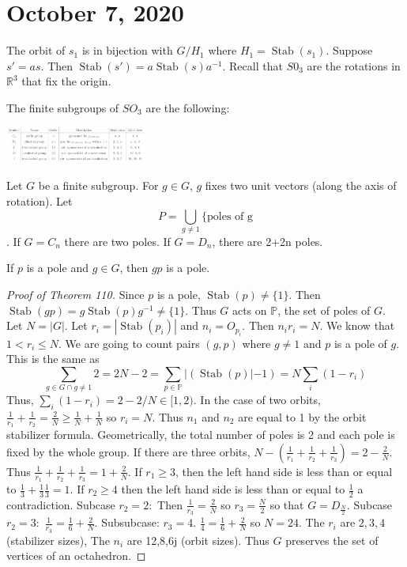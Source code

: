 \documentclass{article}
\newcommand{\R}{\mathbb{R}}
\DeclareMathOperator{\Stab}{Stab}
\begin{document}
\section{October 7, 2020}
The orbit of $s_1$ is in bijection with $G/H_1$ where $H_1=\Stab(s_1)$. Suppose $s'=as$. Then $\Stab(s')=a\Stab(s)a^{-1}$. Recall that $S0_3$ are the rotations in $\R^3$ that fix the origin.
\begin{theorem}
The finite subgroups of $SO_3$ are the following:
    \begin{center}
        \includegraphics[width=0.35\textwidth]{Image 1 1072020.PNG}
    \end{center}
\end{theorem}
Let $G$ be a finite subgroup. For $g\in G$, $g$ fixes two unit vectors (along the axis of rotation). Let $$P=\bigcup_{g\neq 1}\{\textrm{poles of g}$$. If $G=C_n$ there are two poles. If $G=D_n$, there are 2+2n poles.
\begin{lemma}
If $p$ is a pole and $g\in G$, then $gp$ is a  pole.
\end{lemma}
\begin{proof}[Proof of Theorem 110]
Since $p$ is a pole, $\Stab(p)\neq \{1\}$. Then $\Stab(gp)=g\Stab(p)g^{-1}\neq\{1\}$. Thus $G$ acts on $\mathbb{P}$, the set of poles of $G$. Let $N=|G|$. Let $r_i=|\Stab(p_i)|$ and $n_i=O_{p_i}$. Then $n_ir_i=N$. We know that $1<r_i\leq N$. We are going to count pairs $(g,p)$ where $g\neq 1$ and $p$ is a pole of $g$. This is the same as $$\sum_{g\in G\cap g\neq 1}2=2N-2=\sum_{p\in\mathbb{P}}|(\Stab(p)|-1)=N\sum_i(1-r_i)$$ Thus, $\sum_i(1-r_i)=2-2/N\in[1,2)$. In the case of two orbits, $\frac{1}{r_1}+\frac{1}{r_2}=\frac{2}{N}\geq \frac{1}{N}+\frac{1}{N}$ so $r_i=N$. Thus $n_1$ and $n_2$ are equal to 1 by the orbit stabilizer formula. Geometrically, the total number of poles is 2 and each pole is fixed by the whole group. If there are three orbits, $N-(\frac{1}{r_1}+\frac{1}{r_2}+\frac{1}{r_3})=2-\frac{2}{N}$. Thus $\frac{1}{r_1}+\frac{1}{r_2}+\frac{1}{r_3}=1+\frac{2}{N}$. If $r_1\geq 3$, then the left hand side is less than or equal to $\frac{1}{3}+\frac{1}{3}\frac{1}{3}=1$. If $r_2\geq 4$ then the left hand side is less than or equal to $\frac{1}{2}$ a contradiction. Subcase $r_2=2:$ Then $\frac{1}{r_3}=\frac{2}{N}$ so $r_3=\frac{N}{2}$ so that $G=D_{\frac{N}{2}}$. Subcase $r_2=3:$ $\frac{1}{r_3}=\frac{1}{6}+\frac{2}{N}$. Subsubcase: $r_3=4$. $\frac{1}{4}=\frac{1}{6}+\frac{2}{N}$ so $N=24$. The $r_i$ are $2,3,4$ (stabilizer sizes), The $n_i$ are 12,8,6j (orbit sizes). Thus $G$ preserves the set of vertices of an octahedron.
\end{proof}
\end{document}
